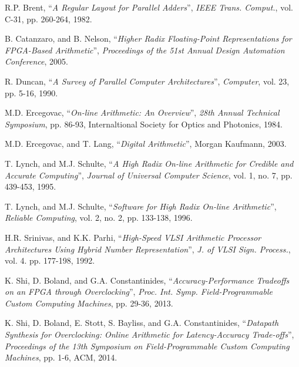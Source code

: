 \begin{thebibliography}{1}



  R.P. Brent,
  ``\textit{A Regular Layout for Parallel Adders}'',
  \textit{IEEE Trans. Comput.}, vol. C-31, pp. 260-264,
  1982.

  B. Catanzaro, and B. Nelson,
  ``\textit{Higher Radix Floating-Point Representations for FPGA-Based
  Arithmetic}'',
  \textit{Proceedings of the 51st Annual Design Automation Conference},
  2005.

  R. Duncan,
  ``\textit{A Survey of Parallel Computer Architectures}'',
  \textit{Computer}, vol. 23, pp. 5-16,
  1990.

  M.D. Ercegovac,
  ``\textit{On-line Arithmetic: An Overview}'',
  \textit{28th Annual Technical Symposium}, pp. 86-93,
  Internaltional Society for Optics and Photonics,
  1984.

  M.D. Ercegovac, and T. Lang,
  ``\textit{Digital Arithmetic}'',
  Morgan Kaufmann,
  2003.

  T. Lynch, and M.J. Schulte,
  ``\textit{A High Radix On-line Arithmetic for Credible and Accurate
  Computing}'',
  \textit{Journal of Universal Computer Science}, vol. 1, no. 7, pp. 439-453,
  1995.

  T. Lynch, and M.J. Schulte,
  ``\textit{Software for High Radix On-line Arithmetic}'',
  \textit{Reliable Computing}, vol. 2, no. 2, pp. 133-138,
  1996.

  H.R. Srinivas, and K.K. Parhi,
  ``\textit{High-Speed VLSI Arithmetic Processor Architectures Using Hybrid
  Number Representation}'',
  \textit{J. of VLSI Sign. Process.}, vol. 4. pp. 177-198,
  1992.

  K. Shi, D. Boland, and G.A. Constantinides,
  ``\textit{Accuracy-Performance Tradeoffs on an FPGA through Overclocking}'',
  \textit{Proc. Int. Symp. Field-Programmable Custom Computing Machines},
  pp. 29-36,
  2013.

  K. Shi, D. Boland, E. Stott, S. Bayliss, and G.A. Constantinides,
  ``\textit{Datapath Synthesis for Overclocking: Online Arithmetic for
  Latency-Accuracy Trade-offs}'',
  \textit{Proceedings of the 13th Symposium on Field-Programmable Custom
  Computing Machines},
  pp. 1-6, ACM,
  2014.


\end{thebibliography}
